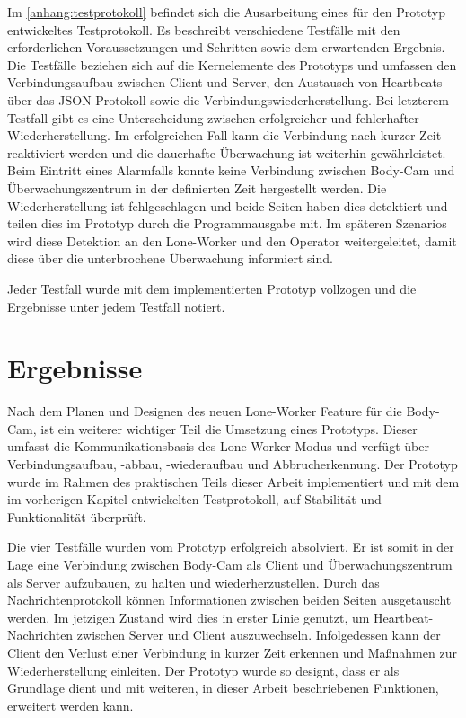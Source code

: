 \documentclass[thesis.tex]{subfiles}
\begin{document}
Im \autoref{anhang:testprotokoll} befindet sich die Ausarbeitung eines für den Prototyp entwickeltes Testprotokoll.
Es beschreibt verschiedene Testfälle mit den erforderlichen Voraussetzungen und Schritten sowie dem erwartenden Ergebnis.
Die Testfälle beziehen sich auf die Kernelemente des Prototyps und umfassen den Verbindungsaufbau zwischen Client und Server,
den Austausch von Heartbeats über das JSON-Protokoll sowie die Verbindungswiederherstellung.
Bei letzterem Testfall gibt es eine Unterscheidung zwischen erfolgreicher und fehlerhafter Wiederherstellung.
Im erfolgreichen Fall kann die Verbindung nach kurzer Zeit reaktiviert werden und die dauerhafte Überwachung ist weiterhin gewährleistet.
Beim Eintritt eines Alarmfalls konnte keine Verbindung zwischen Body-Cam und Überwachungszentrum in der definierten Zeit hergestellt werden.
Die Wiederherstellung ist fehlgeschlagen und beide Seiten haben dies detektiert und teilen dies im Prototyp durch die Programmausgabe mit.
Im späteren Szenarios wird diese Detektion an den Lone-Worker und den Operator weitergeleitet, damit diese über die unterbrochene Überwachung informiert sind.

Jeder Testfall wurde mit dem implementierten Prototyp vollzogen und die Ergebnisse unter jedem Testfall notiert.

\section{Ergebnisse}

Nach dem Planen und Designen des neuen Lone-Worker Feature für die Body-Cam, ist ein weiterer wichtiger Teil die Umsetzung eines Prototyps.
Dieser umfasst die Kommunikationsbasis des Lone-Worker-Modus und verfügt über Verbindungsaufbau, -abbau, -wiederaufbau und Abbrucherkennung.
Der Prototyp wurde im Rahmen des praktischen Teils dieser Arbeit implementiert und mit dem im vorherigen Kapitel entwickelten Testprotokoll, auf Stabilität und Funktionalität überprüft.

Die vier Testfälle wurden vom Prototyp erfolgreich absolviert.
Er ist somit in der Lage eine Verbindung zwischen Body-Cam als Client und Überwachungszentrum als Server aufzubauen, zu halten und wiederherzustellen.
Durch das Nachrichtenprotokoll können Informationen zwischen beiden Seiten ausgetauscht werden.
Im jetzigen Zustand wird dies in erster Linie genutzt, um Heartbeat-Nachrichten zwischen Server und Client auszuwechseln.
Infolgedessen kann der Client den Verlust einer Verbindung in kurzer Zeit erkennen und Maßnahmen zur Wiederherstellung einleiten.
Der Prototyp wurde so designt, dass er als Grundlage dient und mit weiteren, in dieser Arbeit beschriebenen Funktionen, erweitert werden kann.
\end{document}
